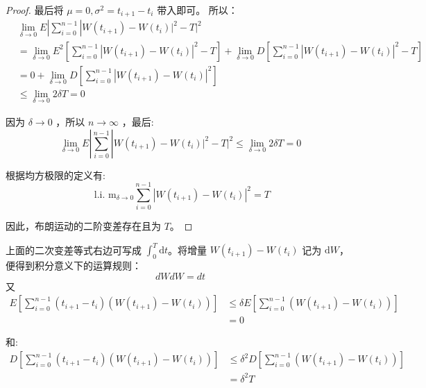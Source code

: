 \begin{proof}
最后将 $\mu=0, \sigma^2=t_{i+1}-t_i$ 带入即可。
所以：
$$
\begin{aligned}
& \lim _{\delta \rightarrow 0} E\left|\sum_{i=0}^{n-1}\right| W\left(t_{i+1}\right)-\left.W\left(t_i\right)\right|^2-\left.T\right|^2 \\
& =\lim _{\delta \rightarrow 0} E^2\left[\sum_{i=0}^{n-1}\left|W\left(t_{i+1}\right)-W\left(t_i\right)\right|^2-T\right]+\lim _{\delta \rightarrow 0} D\left[\sum_{i=0}^{n-1}\left|W\left(t_{i+1}\right)-W\left(t_i\right)\right|^2-T\right] \\
& =0+\lim _{\delta \rightarrow 0} D\left[\sum_{i=0}^{n-1}\left|W\left(t_{i+1}\right)-W\left(t_i\right)\right|^2\right] \\
& \leq\lim _{\delta \rightarrow 0} 2 \delta T=0
\end{aligned}
$$

因为 $\delta \rightarrow 0$ ，所以 $n \rightarrow \infty$ ，最后:
$$
\lim _{\delta \rightarrow 0} E\left|\sum_{i=0}^{n-1}\right| W\left(t_{i+1}\right)-\left.W\left(t_i\right)\right|^2-\left.T\right|^2\leq\lim _{\delta \rightarrow 0} 2 \delta T=0
$$

根据均方极限的定义有:
\begin{equation}
  \text { l.i. } \mathrm{m}_{\delta \rightarrow 0} \sum_{i=0}^{n-1}\left|W\left(t_{i+1}\right)-W\left(t_i\right)\right|^2=T
\end{equation}

因此，布朗运动的二阶变差存在且为 $T$。
\end{proof}

上面的二次变差等式右边可写成 $\int_0^T\mathrm dt$。将增量 $W(t_{i+1})-W(t_i)$ 记为 $\mathrm dW$，便得到积分意义下的运算规则：
\begin{equation}
  dW dW = dt
\end{equation}
又 
$$
\begin{aligned}
E\left[\sum_{i=0}^{n-1}\left(t_{i+1}-t_i\right)\left(W\left(t_{i+1}\right)-W\left(t_i\right)\right)\right] & \leq \delta E\left[\sum_{i=0}^{n-1}\left(W\left(t_{i+1}\right)-W\left(t_i\right)\right)\right] \\
& =0
\end{aligned}
$$

和:
$$
\begin{aligned}
D\left[\sum_{i=0}^{n-1}\left(t_{i+1}-t_i\right)\left(W\left(t_{i+1}\right)-W\left(t_i\right)\right)\right] & \leq \delta^2 D\left[\sum_{i=0}^{n-1}\left(W\left(t_{i+1}\right)-W\left(t_i\right)\right)\right] \\
& =\delta^2 T
\end{aligned}
$$

